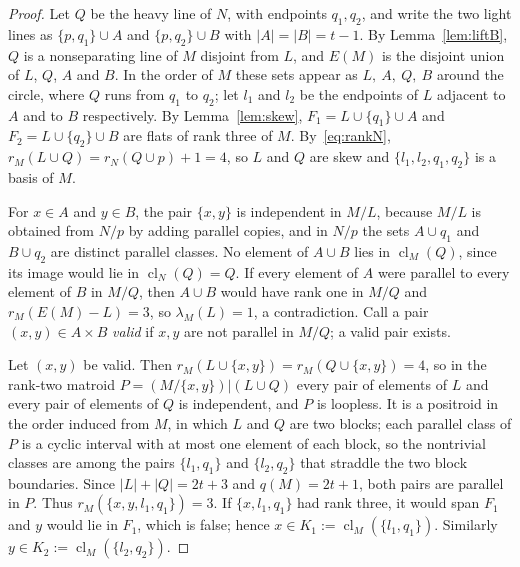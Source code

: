 \documentclass[11pt]{amsart}
\theoremstyle{definition}
\theoremstyle{remark}
\numberwithin{equation}{section}
\newcommand{\cl}{\operatorname{cl}}
\newcommand{\lam}{\lambda}
\begin{document}
\begin{proof}
Let $Q$ be the heavy line of $N$, with endpoints $q_1,q_2$, and write the two light lines as $\{p,q_1\}\cup A$ and $\{p,q_2\}\cup B$ with $|A|=|B|=t-1$. By Lemma~\ref{lem:liftB}, $Q$ is a nonseparating line of $M$ disjoint from $L$, and $E(M)$ is the disjoint union of $L$, $Q$, $A$ and $B$. In the order of $M$ these sets appear as $L,\ A,\ Q,\ B$ around the circle, where $Q$ runs from $q_1$ to $q_2$; let $l_1$ and $l_2$ be the endpoints of $L$ adjacent to $A$ and to $B$ respectively. By Lemma~\ref{lem:skew}, $F_1=L\cup\{q_1\}\cup A$ and $F_2=L\cup\{q_2\}\cup B$ are flats of rank three of $M$. By~\eqref{eq:rankN}, $r_M(L\cup Q)=r_N(Q\cup p)+1=4$, so $L$ and $Q$ are skew and $\{l_1,l_2,q_1,q_2\}$ is a basis of $M$.

For $x\in A$ and $y\in B$, the pair $\{x,y\}$ is independent in $M/L$, because $M/L$ is obtained from $N/p$ by adding parallel copies, and in $N/p$ the sets $A\cup q_1$ and $B\cup q_2$ are distinct parallel classes. No element of $A\cup B$ lies in $\cl_M(Q)$, since its image would lie in $\cl_N(Q)=Q$. If every element of $A$ were parallel to every element of $B$ in $M/Q$, then $A\cup B$ would have rank one in $M/Q$ and $r_M(E(M)-L)=3$, so $\lam_M(L)=1$, a contradiction. Call a pair $(x,y)\in A\times B$ \emph{valid} if $x,y$ are not parallel in $M/Q$; a valid pair exists.

Let $(x,y)$ be valid. Then $r_M(L\cup\{x,y\})=r_M(Q\cup\{x,y\})=4$, so in the rank-two matroid $P=(M/\{x,y\})|(L\cup Q)$ every pair of elements of $L$ and every pair of elements of $Q$ is independent, and $P$ is loopless. It is a positroid in the order induced from $M$, in which $L$ and $Q$ are two blocks; each parallel class of $P$ is a cyclic interval with at most one element of each block, so the nontrivial classes are among the pairs $\{l_1,q_1\}$ and $\{l_2,q_2\}$ that straddle the two block boundaries. Since $|L|+|Q|=2t+3$ and $q(M)=2t+1$, both pairs are parallel in $P$. Thus $r_M(\{x,y,l_1,q_1\})=3$. If $\{x,l_1,q_1\}$ had rank three, it would span $F_1$ and $y$ would lie in $F_1$, which is false; hence $x\in K_1:=\cl_M(\{l_1,q_1\})$. Similarly $y\in K_2:=\cl_M(\{l_2,q_2\})$.


\end{proof}
\end{document}
